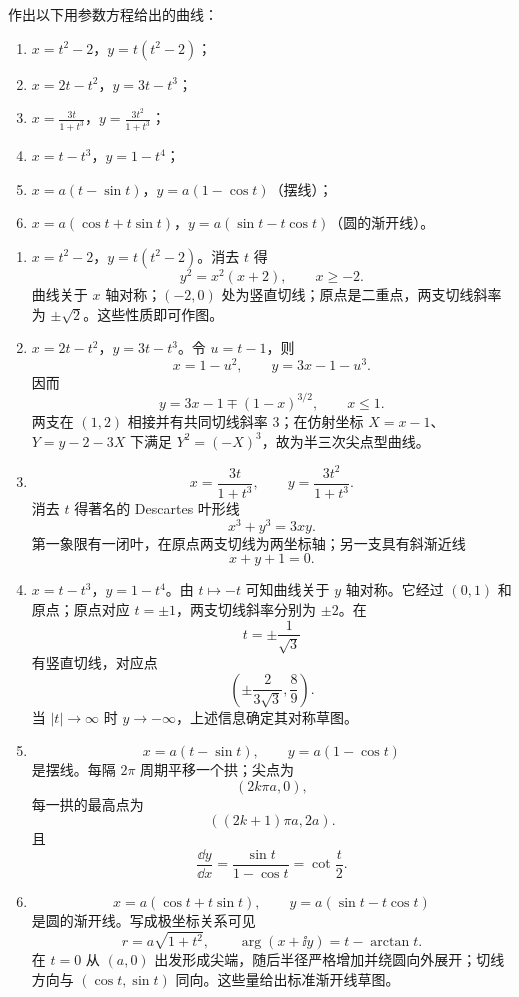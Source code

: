\begin{xexercise}[5]
作出以下用参数方程给出的曲线：
  \begin{enumerate}[label=(\arabic*)]
    \item $x=t^2-2$，$y=t(t^2-2)$；
    \item $x=2t-t^2$，$y=3t-t^3$；
    \item $\displaystyle x=\frac{3t}{1+t^3}$，$\displaystyle y=\frac{3t^2}{1+t^3}$；
    \item $x=t-t^3$，$y=1-t^4$；
    \item $x=a(t-\sin t)$，$y=a(1-\cos t)$（摆线）；
    \item $x=a(\cos t+t\sin t)$，$y=a(\sin t-t\cos t)$（圆的渐开线）。
  \end{enumerate}
\end{xexercise}
\begin{xsolution}
\begin{enumerate}[label=(\arabic*)]
  \item $x=t^2-2$，$y=t(t^2-2)$。消去 $t$ 得
  \[
    y^2=x^2(x+2),\qquad x\ge-2.
  \]
  曲线关于 $x$ 轴对称；$(-2,0)$ 处为竖直切线；原点是二重点，两支切线斜率为 $\pm\sqrt2$。这些性质即可作图。

  \item $x=2t-t^2$，$y=3t-t^3$。令 $u=t-1$，则
  \[
    x=1-u^2,
    \qquad
    y=3x-1-u^3.
  \]
  因而
  \[
    y=3x-1\mp(1-x)^{3/2},\qquad x\le1.
  \]
  两支在 $(1,2)$ 相接并有共同切线斜率 3；在仿射坐标 $X=x-1$、$Y=y-2-3X$ 下满足 $Y^2=(-X)^3$，故为半三次尖点型曲线。

  \item
  \[
    x=\frac{3t}{1+t^3},\qquad y=\frac{3t^2}{1+t^3}.
  \]
  消去 $t$ 得著名的 Descartes 叶形线
  \[
    x^3+y^3=3xy.
  \]
  第一象限有一闭叶，在原点两支切线为两坐标轴；另一支具有斜渐近线
  \[
    x+y+1=0.
  \]

  \item $x=t-t^3$，$y=1-t^4$。由 $t\mapsto-t$ 可知曲线关于 $y$ 轴对称。它经过 $(0,1)$ 和原点；原点对应 $t=\pm1$，两支切线斜率分别为 $\pm2$。在
  \[
    t=\pm\frac1{\sqrt3}
  \]
  有竖直切线，对应点
  \[
    \left(\pm\frac{2}{3\sqrt3},\frac89\right).
  \]
  当 $|t|\to\infty$ 时 $y\to-\infty$，上述信息确定其对称草图。

  \item
  \[
    x=a(t-\sin t),\qquad y=a(1-\cos t)
  \]
  是摆线。每隔 $2\pi$ 周期平移一个拱；尖点为
  \[
    (2k\pi a,0),
  \]
  每一拱的最高点为
  \[
    ((2k+1)\pi a,2a).
  \]
  且
  \[
    \frac{\dd y}{\dd x}=\frac{\sin t}{1-\cos t}=\cot\frac t2.
  \]

  \item
  \[
    x=a(\cos t+t\sin t),\qquad
    y=a(\sin t-t\cos t)
  \]
  是圆的渐开线。写成极坐标关系可见
  \[
    r=a\sqrt{1+t^2},
    \qquad
    \arg(x+\ii y)=t-\arctan t.
  \]
  在 $t=0$ 从 $(a,0)$ 出发形成尖端，随后半径严格增加并绕圆向外展开；切线方向与 $(\cos t,\sin t)$ 同向。这些量给出标准渐开线草图。
\end{enumerate}
\end{xsolution}


